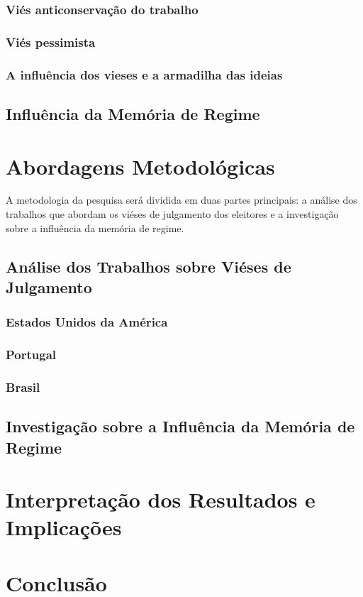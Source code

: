 \subsubsection{Viés anticonservação do trabalho}


\subsubsection{Viés pessimista}


\subsubsection{A influência dos vieses e a armadilha das ideias}


\subsection{Influência da Memória de Regime}

\section{Abordagens Metodológicas}
A metodologia da pesquisa será dividida em duas partes principais: a análise dos trabalhos que abordam os viéses de julgamento dos eleitores e a investigação sobre a influência da memória de regime.

\subsection{Análise dos Trabalhos sobre Viéses de Julgamento}

\subsubsection{Estados Unidos da América}

\subsubsection{Portugal}

\subsubsection{Brasil}

\subsection{Investigação sobre a Influência da Memória de Regime}


\section{Interpretação dos Resultados e Implicações}

\section{Conclusão}

